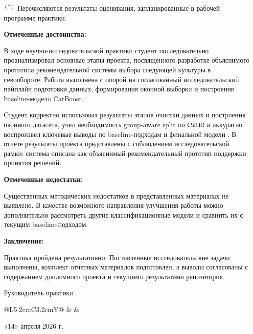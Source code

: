 \vspace{1em}

\noindent\parbox{\textwidth}{$^{(*)}$ Перечисляются результаты оценивания, запланированные в рабочей программе практики.}

\vspace{1em}

\noindent\textbf{Отмеченные достоинства:}

В ходе научно-исследовательской практики студент последовательно проанализировал основные этапы проекта, посвященного разработке объяснимого прототипа рекомендательной системы выбора следующей культуры в севообороте. Работа выполнена с опорой на согласованный исследовательский пайплайн подготовки данных, формирования оконной выборки и построения baseline-модели CatBoost.

Студент корректно использовал результаты этапов очистки данных и построения оконного датасета, учел необходимость group-aware split по \texttt{CSBID} и аккуратно воспроизвел ключевые выводы по baseline-подходам и финальной модели \FinalModel{}. В отчете результаты проекта представлены с соблюдением исследовательской рамки: система описана как объяснимый рекомендательный прототип поддержки принятия решений.

\vspace{0.8em}

\noindent\textbf{Отмеченные недостатки:}

Существенных методических недостатков в представленных материалах не выявлено. В качестве возможного направления улучшения работы можно дополнительно рассмотреть другие классификационные модели и сравнить их с текущим baseline-подходом.

\vspace{0.8em}

\noindent\textbf{Заключение:}

Практика пройдена результативно. Поставленные исследовательские задачи выполнены, комплект отчетных материалов подготовлен, а выводы согласованы с содержанием дипломного проекта и текущими результатами репозитория.

\vspace{1.5em}

\noindent Руководитель практики

\vspace{0.5cm}

\noindent
\begin{tabularx}{\textwidth}{@{}L{5.2cm}C{3.2cm}Y@{}}
\SupervisorRole{} & \underline{\hspace{3cm}} & \SupervisorName
\end{tabularx}

\vspace{1.5cm}

\noindent «14» апреля 2026 г.
